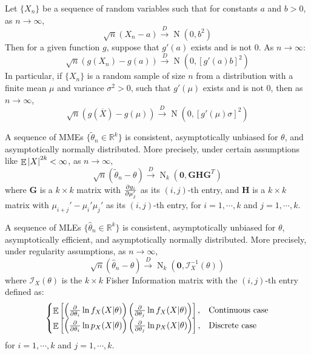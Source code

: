 \documentclass{huhtakm-template-book-v2}
\DeclareMathOperator{\E}{\mathbb{E}}
\DeclareMathOperator{\N}{N}
\begin{document}
    \begin{thm}
        Let $\{X_{n}\}$ be a sequence of random variables such that for constants $a$ and $b>0$, as $n\to\infty$,
        \begin{equation*}
            \sqrt{n}(X_{n}-a)\xrightarrow{D}\N(0,b^{2})
        \end{equation*}
        Then for a given function $g$, suppose that $g'(a)$ exists and is not $0$. As $n\to\infty$:
        \begin{equation*}
            \sqrt{n}(g(X_{n})-g(a))\xrightarrow{D}\N(0,[g'(a)b]^{2})
        \end{equation*}
        In particular, if $\{X_{n}\}$ is a random sample of size $n$ from a distribution with a finite mean $\mu$ and variance $\sigma^{2}>0$, such that $g'(\mu)$ exists and is not $0$, then as $n\to\infty$,
        \begin{equation*}
            \sqrt{n}(g(\overline{X})-g(\mu))\xrightarrow{D}\N(0,[g'(\mu)\sigma]^{2})
        \end{equation*}
    \end{thm}
    \begin{thm}
        A sequence of MMEs $\{\tilde{\theta}_{n}\in\mathbb{R}^{k}\}$ is consistent, asymptotically unbiased for $\theta$, and asymptotically normally distributed. More precisely, under certain assumptions like $\E\abs{X}^{2k}<\infty$, as $n\to\infty$,
        \begin{equation*}
            \sqrt{n}(\tilde{\theta}_{n}-\theta)\xrightarrow{D}\N_{k}(\mathbf{0},\mathbf{GHG}^{T})
        \end{equation*}
        where $\mathbf{G}$ is a $k\times k$ matrix with $\pdv{g_{i}}{\mu_{j}'}$ as its $(i,j)$-th entry, and $\mathbf{H}$ is a $k\times k$ matrix with $\mu_{i+j}'-\mu_{i}'\mu_{j}'$ as its $(i,j)$-th entry, for $i=1,\cdots,k$ and $j=1,\cdots,k$.
    \end{thm}
    \begin{thm}
        A sequence of MLEs $\{\hat{\theta}_{n}\in\mathbb{R}^{k}\}$ is consistent, asymptotically unbiased for $\theta$, asymptotically efficient, and asymptotically normally distributed. More precisely, under regularity assumptions, as $n\to\infty$,
        \begin{equation*}
            \sqrt{n}(\hat{\theta}_{n}-\theta)\xrightarrow{D}\N_{k}(\mathbf{0},\mathcal{I}_{X}^{-1}(\theta))
        \end{equation*}
        where $\mathcal{I}_{X}(\theta)$ is the $k\times k$ Fisher Information matrix with the $(i,j)$-th entry defined as:
        \begin{equation*}
            \begin{cases}
                \E\left[\left(\pdv*{\ln{f_{X}(X|\theta)}}{\theta_{i}}\right)\left(\pdv*{\ln{f_{X}(X|\theta)}}{\theta_{j}}\right)\right], &\text{Continuous case}\\
                \E\left[\left(\pdv*{\ln{p_{X}(X|\theta)}}{\theta_{i}}\right)\left(\pdv*{\ln{p_{X}(X|\theta)}}{\theta_{j}}\right)\right], &\text{Discrete case}
            \end{cases}
        \end{equation*}
        for $i=1,\cdots,k$ and $j=1,\cdots,k$.
    \end{thm}
\end{document}

